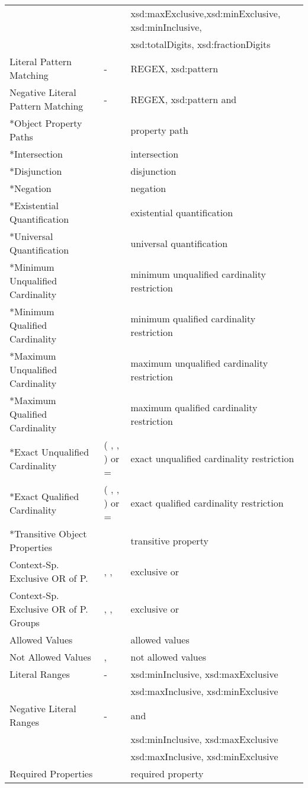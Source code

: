 \documentclass{llncs}
\begin{document}
\begin{table}[H]
\begin{center}
\begin{tabular}{lll}
												&& xsd:maxExclusive,xsd:minExclusive, xsd:minInclusive, \\
												&& xsd:totalDigits, xsd:fractionDigits \\
Literal Pattern Matching & - & REGEX, xsd:pattern \\
Negative Literal Pattern Matching & - & REGEX, xsd:pattern and  \\ 
*Object Property Paths &  & property path \\
*Intersection &  & intersection \\
*Disjunction &  & disjunction \\
*Negation &  & negation \\
*Existential Quantification &  & existential quantification \\
*Universal Quantification &  & universal quantification \\
*Minimum Unqualified Cardinality &  &  minimum unqualified cardinality restriction \\
*Minimum Qualified Cardinality &  &  minimum qualified cardinality restriction \\
*Maximum Unqualified Cardinality &  &  maximum unqualified cardinality restriction \\
*Maximum Qualified Cardinality &  &  maximum qualified cardinality restriction \\
*Exact Unqualified Cardinality & ( , ,  ) or = &  exact unqualified cardinality restriction \\
*Exact Qualified Cardinality & ( , ,  ) or = &  exact qualified cardinality restriction \\
*Transitive Object Properties &  & transitive property \\
Context-Sp. Exclusive OR of P. & , ,  & exclusive or \\
Context-Sp. Exclusive OR of P. Groups & , ,  & exclusive or \\
Allowed Values &  & allowed values \\
Not Allowed Values & ,  & not allowed values \\
Literal Ranges & - & xsd:minInclusive, xsd:maxExclusive \\
               & & xsd:maxInclusive, xsd:minExclusive \\
Negative Literal Ranges & - &  and \\  
                        && xsd:minInclusive, xsd:maxExclusive \\
                        && xsd:maxInclusive, xsd:minExclusive \\
Required Properties &  & required property \\	
	
    \bottomrule
    \end{tabular}
    \end{center}
\end{table}
\end{document}
